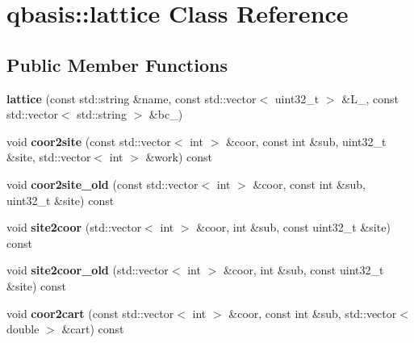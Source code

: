 \hypertarget{classqbasis_1_1lattice}{}\section{qbasis\+:\+:lattice Class Reference}
\label{classqbasis_1_1lattice}
\subsection*{Public Member Functions}
\begin{DoxyCompactItemize}
\item 
\mbox{\label{classqbasis_1_1lattice_a38eb33eb0cb76d8dcb0bc38ac54cea87}} 
{\bfseries lattice} (const std\+::string \&name, const std\+::vector$<$ uint32\+\_\+t $>$ \&L\+\_\+, const std\+::vector$<$ std\+::string $>$ \&bc\+\_\+)
\item 
\mbox{\label{classqbasis_1_1lattice_afd2dc8ed15112889f188136883bb0f79}} 
void {\bfseries coor2site} (const std\+::vector$<$ int $>$ \&coor, const int \&sub, uint32\+\_\+t \&site, std\+::vector$<$ int $>$ \&work) const
\item 
\mbox{\label{classqbasis_1_1lattice_ae73644890649cea51a4d6ca2df85e77a}} 
void {\bfseries coor2site\+\_\+old} (const std\+::vector$<$ int $>$ \&coor, const int \&sub, uint32\+\_\+t \&site) const
\item 
\mbox{\label{classqbasis_1_1lattice_a08a8d0dc135d2d32ec2af6d8c3d5adc7}} 
void {\bfseries site2coor} (std\+::vector$<$ int $>$ \&coor, int \&sub, const uint32\+\_\+t \&site) const
\item 
\mbox{\label{classqbasis_1_1lattice_a23135317adbef3bea5bcdba7f7ce3aae}} 
void {\bfseries site2coor\+\_\+old} (std\+::vector$<$ int $>$ \&coor, int \&sub, const uint32\+\_\+t \&site) const
\item 
\mbox{\label{classqbasis_1_1lattice_a3b6f75bc2b320987aa493a3bc0099df4}} 
void {\bfseries coor2cart} (const std\+::vector$<$ int $>$ \&coor, const int \&sub, std\+::vector$<$ double $>$ \&cart) const
\item 
\mbox{\label{classqbasis_1_1lattice_a409fd2cfb73073a27b57a301214c33c6}} 

\end{DoxyCompactItemize}
